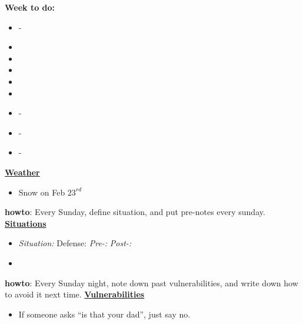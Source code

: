 \documentclass[11pt]{article}
\begin{document}
{            %
            \textbf{Week to do:} 
            \begin{itemize}
              \small \item \small - 
            \item \small
            \item \small
            \item \small
            \item \small
            \item \small
            \item \small - 
            \item \small - 
            \item \small - 
            \end{itemize} 
            \newpage 
            \textbf{\small \underline{Weather}} 
            \begin{itemize} 
              \item \tiny Snow on Feb $23^{rd}$ 
            \end{itemize} 

            \textbf{howto}: Every Sunday, define situation, and put pre-notes every sunday. \\
            \textbf{\small \underline{Situations}} \\ 
            \begin{itemize}
            \item \tiny \textit{Situation:} Defense: \textit{Pre-:}
              \textit{Post-:} 
 
           \item \tiny 
            \end{itemize}
          
            \textbf{howto}: Every Sunday night, note down  past vulnerabilities, and write down how to avoid it next time. 
            \textbf{\small \underline{Vulnerabilities}} \\
            \begin{itemize}
              \tiny \item \tiny  If someone asks ``is that your dad'', just say no. 
            \end{itemize}    
            \newpage 
            
}
\end{document}
